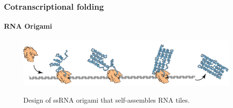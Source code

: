 \documentclass[dvipdfmx,10pt]{beamer}
\begin{document}
%
%
%
%
%
%


\begin{frame}\frametitle{Cotranscriptional folding}
\framesubtitle{RNA Origami \scriptsize{\cite{Geary2014}}}

\begin{figure}
\centering
\href{run:CF.mp4}{
\includegraphics[width=\linewidth]{rna_origami.pdf}
}
\caption{Design of ssRNA origami that self-assembles RNA tiles.}
\end{figure}
\end{frame}
\end{document}
